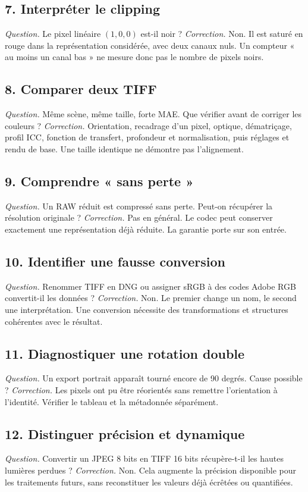 \subsection*{7. Interpréter le clipping}
\emph{Question.} Le pixel linéaire $(1,0,0)$ est-il noir ?
\emph{Correction.} Non. Il est saturé en rouge dans
la représentation considérée, avec deux canaux
nuls. Un compteur « au moins un canal bas »
ne mesure donc pas le nombre de pixels noirs.

\subsection*{8. Comparer deux TIFF}
\emph{Question.} Même scène, même taille, forte MAE.
Que vérifier avant de corriger les couleurs ?
\emph{Correction.} Orientation, recadrage d'un
pixel, optique, dématriçage, profil ICC, fonction
de transfert, profondeur et normalisation, puis
réglages et rendu de base. Une taille identique
ne démontre pas l'alignement.

\subsection*{9. Comprendre « sans perte »}
\emph{Question.} Un RAW réduit est compressé sans
perte. Peut-on récupérer la résolution originale ?
\emph{Correction.} Pas en général. Le codec peut
conserver exactement une représentation déjà
réduite. La garantie porte sur son entrée.

\subsection*{10. Identifier une fausse conversion}
\emph{Question.} Renommer TIFF en DNG ou assigner
sRGB à des codes Adobe RGB convertit-il les données ?
\emph{Correction.} Non. Le premier change un nom,
le second une interprétation. Une conversion
nécessite des transformations et structures
cohérentes avec le résultat.

\subsection*{11. Diagnostiquer une rotation double}
\emph{Question.} Un export portrait apparaît
tourné encore de 90 degrés. Cause possible ?
\emph{Correction.} Les pixels ont pu être
réorientés sans remettre l'orientation à l'identité.
Vérifier le tableau et la métadonnée séparément.

\subsection*{12. Distinguer précision et dynamique}
\emph{Question.} Convertir un JPEG 8 bits en
TIFF 16 bits récupère-t-il les hautes lumières
perdues ?
\emph{Correction.} Non. Cela augmente la précision
disponible pour les traitements futurs, sans
reconstituer les valeurs déjà écrêtées ou quantifiées.

